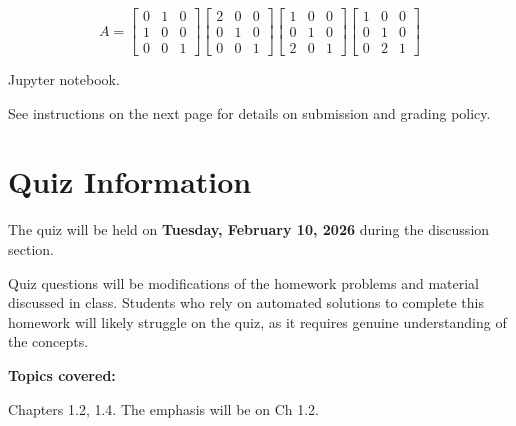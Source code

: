 \documentclass[reqno, answers]{exam}
\begin{document}
\begin{questions}
\begin{parts}
  \begin{solution}
  $$A = \begin{bmatrix} 0 & 1 & 0 \\ 1 & 0 & 0 \\ 0 & 0 & 1 \end{bmatrix}
  \begin{bmatrix} 2 & 0 & 0 \\ 0 & 1 & 0 \\ 0 & 0 & 1 \end{bmatrix}
  \begin{bmatrix} 1 & 0 & 0 \\ 0 & 1 & 0 \\ 2 & 0 & 1 \end{bmatrix}
  \begin{bmatrix} 1 & 0 & 0 \\ 0 & 1 & 0 \\ 0 & 2 & 1 \end{bmatrix}$$
  \end{solution}
\end{parts}

\question 

Jupyter notebook.

\end{questions}

See instructions on the next page for details on submission and grading policy.


\section*{Quiz Information}

The quiz will be held on {\bf Tuesday, February 10, 2026} during the discussion section.

Quiz questions will be modifications of the homework problems and material discussed in class. Students who rely on automated solutions to complete this homework will likely struggle on the quiz, as it requires genuine understanding of the concepts.

\textbf{Topics covered:} 

Chapters 1.2, 1.4. The emphasis will be on Ch 1.2.
\end{document}
